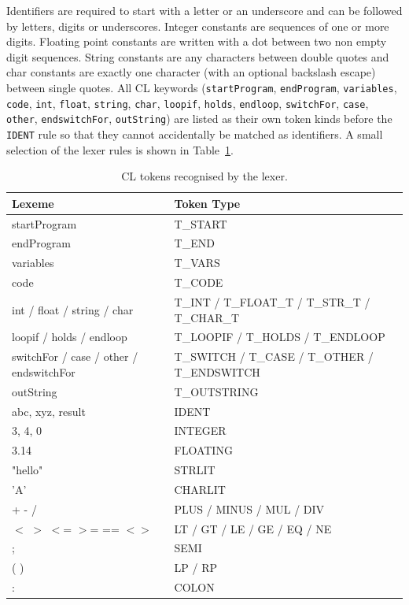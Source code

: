 \documentclass[12pt,a4paper]{report}
\begin{document}
Identifiers are required to start with a letter or an underscore and can be followed by letters, digits or underscores. Integer constants are sequences of one or more digits. Floating point constants are written with a dot between two non empty digit sequences. String constants are any characters between double quotes and char constants are exactly one character (with an optional backslash escape) between single quotes. All CL keywords (\texttt{startProgram}, \texttt{endProgram}, \texttt{variables}, \texttt{code}, \texttt{int}, \texttt{float}, \texttt{string}, \texttt{char}, \texttt{loopif}, \texttt{holds}, \texttt{endloop}, \texttt{switchFor}, \texttt{case}, \texttt{other}, \texttt{endswitchFor}, \texttt{outString}) are listed as their own token kinds before the \texttt{IDENT} rule so that they cannot accidentally be matched as identifiers. A small selection of the lexer rules is shown in Table~\ref{tab:tokens}.

\begin{table}[H]
\centering
\begin{tabular}{|l|l|}
\hline
\textbf{Lexeme} & \textbf{Token Type} \\
\hline
startProgram & T\_START \\
endProgram & T\_END \\
variables & T\_VARS \\
code & T\_CODE \\
int / float / string / char & T\_INT / T\_FLOAT\_T / T\_STR\_T / T\_CHAR\_T \\
loopif / holds / endloop & T\_LOOPIF / T\_HOLDS / T\_ENDLOOP \\
switchFor / case / other / endswitchFor & T\_SWITCH / T\_CASE / T\_OTHER / T\_ENDSWITCH \\
outString & T\_OUTSTRING \\
abc, xyz, result & IDENT \\
3, 4, 0 & INTEGER \\
3.14 & FLOATING \\
"hello" & STRLIT \\
'A' & CHARLIT \\
+ \quad - \quad * \quad / & PLUS / MINUS / MUL / DIV \\
$<$ \quad $>$ \quad $<$= \quad $>$= \quad == \quad $<>$ & LT / GT / LE / GE / EQ / NE \\
; & SEMI \\
( \quad ) & LP / RP \\
: & COLON \\
\hline
\end{tabular}
\caption{CL tokens recognised by the lexer.}
\label{tab:tokens}
\end{table}
\end{document}
